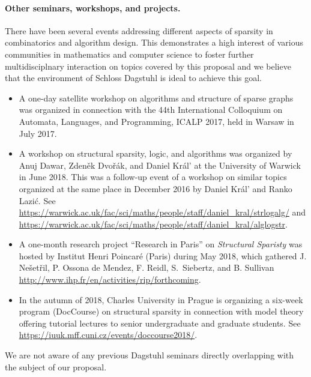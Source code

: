 \paragraph*{Other seminars, workshops, and projects.}
There have been several events addressing different aspects of sparsity in combinatorics and algorithm design.
This demonstrates a high interest of various communities in mathematics and computer science
to foster further multidisciplnary interaction on topics covered by this proposal and
we believe that the environment of Schloss Dagstuhl is ideal to achieve this goal.
\begin{itemize}
\item A one-day satellite workshop on algorithms and structure of sparse graphs was organized in connection with the 44th International Colloquium on Automata, Languages, and Programming, ICALP 2017, held in Warsaw in July 2017.
\item A workshop on structural sparsity, logic, and algorithms was organized by Anuj Dawar, Zden\v ek Dvo\v{r}\'ak, and Daniel Kr\'al' at the University of Warwick in June 2018. This was a follow-up event of a workshop on similar topics organized at the same place in December 2016 by Daniel Kr\'al' and Ranko Lazi\'c. See \url{https://warwick.ac.uk/fac/sci/maths/people/staff/daniel_kral/strlogalg/}
and \url{https://warwick.ac.uk/fac/sci/maths/people/staff/daniel_kral/alglogstr}.
\item A one-month research project ``Research in Paris'' on {\em Structural Sparisty} was hosted by Institut Henri Poincar\'e (Paris) during May 2018, which gathered J. Ne\v set\v ril, P. Ossona de Mendez, F. Reidl, S.~Siebertz, and B. Sullivan 
\url{http://www.ihp.fr/en/activities/rip/forthcoming}.
\item In the autumn of 2018, Charles University in Prague is organizing a six-week program (DocCourse) on structural sparsity in connection with model theory offering tutorial lectures to senior undergraduate and graduate students. See \url{https://iuuk.mff.cuni.cz/events/doccourse2018/}.
\end{itemize}
We are not aware of any previous Dagstuhl seminars directly overlapping with the subject of our proposal.
